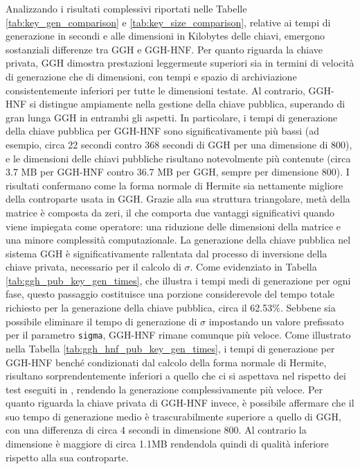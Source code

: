Analizzando i risultati complessivi riportati nelle Tabelle \ref{tab:key_gen_comparison} e 
\ref{tab:key_size_comparison}, relative ai tempi di generazione 
in secondi e alle dimensioni in Kilobytes delle chiavi, emergono sostanziali differenze tra GGH e GGH-HNF.
Per quanto riguarda la chiave privata, GGH dimostra prestazioni leggermente superiori 
sia in termini di velocità di generazione che di dimensioni, con tempi e spazio di 
archiviazione consistentemente inferiori per tutte le dimensioni testate. Al contrario, 
GGH-HNF si distingue ampiamente nella gestione della chiave pubblica, superando di gran 
lunga GGH in entrambi gli aspetti. In particolare, i tempi di generazione della chiave 
pubblica per GGH-HNF sono significativamente più bassi (ad esempio, circa 22 secondi 
contro 368 secondi di GGH per una dimensione di 800), e le dimensioni delle chiavi 
pubbliche risultano notevolmente più contenute (circa 3.7 MB per GGH-HNF contro 36.7 MB 
per GGH, sempre per dimensione 800). I risultati confermano come la forma normale di 
Hermite sia nettamente migliore della controparte usata in GGH. 
Grazie alla sua struttura triangolare, metà della matrice è composta da zeri, 
il che comporta due vantaggi significativi quando viene impiegata come operatore: 
una riduzione delle dimensioni della matrice e una minore complessità computazionale.
La generazione della chiave pubblica nel sistema GGH è significativamente rallentata 
dal processo di inversione della chiave privata, necessario per il calcolo di $\sigma$. 
Come evidenziato in Tabella \ref{tab:ggh_pub_key_gen_times}, che illustra i tempi medi 
di generazione per ogni fase, questo passaggio costituisce una porzione considerevole 
del tempo totale richiesto per la generazione della chiave pubblica, circa il 62.53\%. 
Sebbene sia possibile eliminare il tempo di generazione di $\sigma$ impostando un valore 
prefissato per il parametro \texttt{sigma}, GGH-HNF rimane comunque più veloce. 
Come illustrato nella Tabella \ref{tab:ggh_hnf_pub_key_gen_times}, 
i tempi di generazione per GGH-HNF benché condizionati dal calcolo della forma normale di 
Hermite, risultano sorprendentemente inferiori a quello che ci si aspettava nel 
rispetto dei test eseguiti in \cite{HNF04}, rendendo la generazione 
complessivamente più veloce. Per quanto riguarda la chiave 
privata di GGH-HNF invece, è possibile affermare che il suo tempo di generazione medio è trascurabilmente
superiore a quello di GGH, con una differenza di circa 4 secondi in dimensione 800. Al contrario
la dimensione è maggiore di circa 1.1MB rendendola quindi di qualità inferiore rispetto alla
sua controparte. 
    
